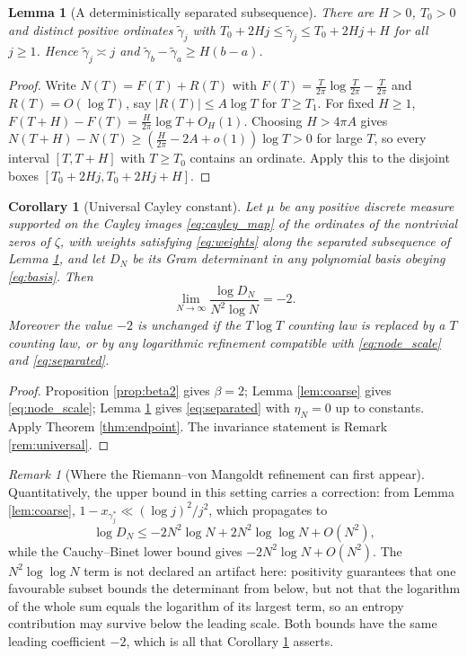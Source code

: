 \documentclass[11pt]{amsart}
\numberwithin{equation}{section}
\theoremstyle{plain}
\newtheorem{lemma}[theorem]{Lemma}
\newtheorem{corollary}[theorem]{Corollary}
\theoremstyle{definition}
\theoremstyle{remark}
\newtheorem{remark}[theorem]{Remark}
\begin{document}
\begin{lemma}[A deterministically separated subsequence]
\label{lem:separated}
There are $H>0$, $T_{0}>0$ and distinct positive ordinates $\widetilde\gamma_{j}$ with
$T_{0}+2Hj\le\widetilde\gamma_{j}\le T_{0}+2Hj+H$ for all $j\ge1$. Hence
$\widetilde\gamma_{j}\asymp j$ and $\widetilde\gamma_{b}-\widetilde\gamma_{a}\ge H(b-a)$.
\end{lemma}

\begin{proof}
Write $N(T)=F(T)+R(T)$ with $F(T)=\frac T{2\pi}\log\frac T{2\pi}-\frac T{2\pi}$ and
$R(T)=O(\log T)$, say $|R(T)|\le A\log T$ for $T\ge T_{1}$. For fixed $H\ge1$,
$F(T+H)-F(T)=\frac H{2\pi}\log T+O_{H}(1)$. Choosing $H>4\pi A$ gives
$N(T+H)-N(T)\ge(\frac H{2\pi}-2A+o(1))\log T>0$ for large $T$, so every interval $[T,T+H]$ with
$T\ge T_{0}$ contains an ordinate. Apply this to the disjoint boxes $[T_{0}+2Hj,T_{0}+2Hj+H]$.
\end{proof}

\begin{corollary}[Universal Cayley constant]
\label{cor:cayley}
Let $\mu$ be any positive discrete measure supported on the Cayley images \eqref{eq:cayley_map} of
the ordinates of the nontrivial zeros of $\zeta$, with weights satisfying \eqref{eq:weights} along
the separated subsequence of Lemma \ref{lem:separated}, and let $D_{N}$ be its Gram determinant in
any polynomial basis obeying \eqref{eq:basis}. Then
\begin{equation}
\boxed{\ \lim_{N\to\infty}\frac{\log D_{N}}{N^{2}\log N}=-2.\ }
\end{equation}
Moreover the value $-2$ is unchanged if the $T\log T$ counting law is replaced by a $T$ counting
law, or by any logarithmic refinement compatible with \eqref{eq:node_scale} and
\eqref{eq:separated}.
\end{corollary}

\begin{proof}
Proposition \ref{prop:beta2} gives $\beta=2$; Lemma \ref{lem:coarse} gives \eqref{eq:node_scale};
Lemma \ref{lem:separated} gives \eqref{eq:separated} with $\eta_{N}=0$ up to constants. Apply
Theorem \ref{thm:endpoint}. The invariance statement is Remark \ref{rem:universal}.
\end{proof}

\begin{remark}[Where the Riemann--von Mangoldt refinement can first appear]
Quantitatively, the upper bound in this setting carries a correction: from Lemma \ref{lem:coarse},
$1-x_{\gamma_{j}^{*}}\ll(\log j)^{2}/j^{2}$, which propagates to
\[
\log D_{N}\le-2N^{2}\log N+2N^{2}\log\log N+O(N^{2}),
\]
while the Cauchy--Binet lower bound gives $-2N^{2}\log N+O(N^{2})$. The $N^{2}\log\log N$ term is not
declared an artifact here: positivity guarantees that one favourable subset bounds the determinant
from below, but not that the logarithm of the whole sum equals the logarithm of its largest term, so
an entropy contribution may survive below the leading scale. Both bounds have the same leading
coefficient $-2$, which is all that Corollary \ref{cor:cayley} asserts.
\end{remark}
\end{document}
